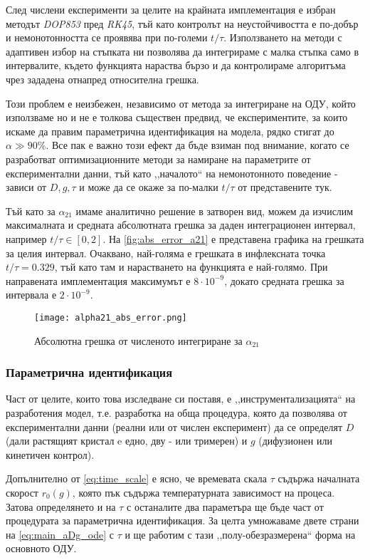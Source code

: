 След числени експерименти за целите на крайната имплементация е избран методът \textit{DOP853} пред \textit{RK45}, тъй като контролът на неустойчивостта  е по-добър и немонотонността се проявява при по-големи $t/\tau$. Използването на методи с адаптивен избор на стъпката ни позволява да интегрираме с малка стъпка само в интервалите, където функцията нараства бързо и да контролираме алгоритъма чрез зададена отнапред относителна грешка.

Този проблем е неизбежен, независимо от метода за интегриране на ОДУ, който използваме но и не е толкова съществен предвид, че експериментите, за които искаме да правим параметрична идентификация на модела, рядко стигат до $\alpha \gg 90\%$. Все пак е важно този ефект да бъде взиман под внимание, когато се разработват оптимизационните методи за намиране на параметрите от експериментални данни, тъй като ,,началото`` на немонотонното поведение - зависи от $D, g, \tau$ и може да се окаже за по-малки $t/\tau$ от представените тук.

Тъй като за $\alpha_{21}$ имаме аналитично решение в затворен вид, можем да изчислим максималната и средната абсолютната грешка за даден интеграционен интервал, например $t/\tau \in [0, 2]$. На \autoref{fig:abs_error_a21} е представена графика на грешката за целия интервал. Очаквано, най-голяма е грешката в инфлексната точка $t/\tau = 0.329$, тъй като там и нарастването на функцията е най-голямо. При направената имплементация максимумът е $8\cdot10^{-9}$, докато средната грешка за интервала е $2\cdot10^{-9}$. 

\begin{figure}[hbtp]
    \centering
    \texttt{[image: alpha21\_abs\_error.png]}
    \caption{Абсолютна грешка от численото интегриране за $\alpha_{21}$}
    \label{fig:abs_error_a21}
\end{figure}

\subsubsection{Параметрична идентификация}
\label{subsub:parametric_identification}
Част от целите, които това изследване си поставя, е ,,инструментализацията`` на разработения модел, т.е. разработка на обща процедура, която да позволява от експериментални данни (реални или от числен експеримент) да се определят $D$ (дали растящият кристал e едно, дву - или тримерен) и $g$ (дифузионен или кинетичен контрол). 

Допълнително от \autoref{eq:time_scale} е ясно, че времевата скала $\tau$ съдържа началната скорост $r_0(g)$, която пък съдържа температурната зависимост на процеса. Затова определянето и на $\tau$ с останалите два параметъра ще бъде част от процедурата за параметрична идентификация. За целта умножаваме двете страни на \autoref{eq:main_aDg_ode} с $\tau$ и ще работим с тази ,,полу-обезразмерена`` форма на основното ОДУ.

